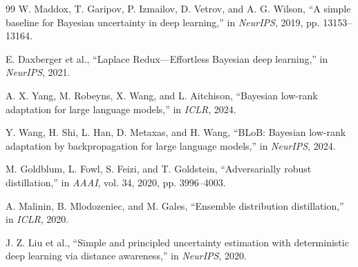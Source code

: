 \documentclass[12pt,a4paper]{article}
\theoremstyle{definition}
\begin{document}
\begin{thebibliography}{99}
W. Maddox, T. Garipov, P. Izmailov, D. Vetrov, and A. G. Wilson, ``A simple baseline for Bayesian uncertainty in deep learning,'' in \emph{NeurIPS}, 2019, pp. 13153--13164.

E. Daxberger et al., ``Laplace Redux---Effortless Bayesian deep learning,'' in \emph{NeurIPS}, 2021.

A. X. Yang, M. Robeyns, X. Wang, and L. Aitchison, ``Bayesian low-rank adaptation for large language models,'' in \emph{ICLR}, 2024.

Y. Wang, H. Shi, L. Han, D. Metaxas, and H. Wang, ``BLoB: Bayesian low-rank adaptation by backpropagation for large language models,'' in \emph{NeurIPS}, 2024.

M. Goldblum, L. Fowl, S. Feizi, and T. Goldstein, ``Adversarially robust distillation,'' in \emph{AAAI}, vol. 34, 2020, pp. 3996--4003.

A. Malinin, B. Mlodozeniec, and M. Gales, ``Ensemble distribution distillation,'' in \emph{ICLR}, 2020.

J. Z. Liu et al., ``Simple and principled uncertainty estimation with deterministic deep learning via distance awareness,'' in \emph{NeurIPS}, 2020.

\end{thebibliography}
\end{document}
